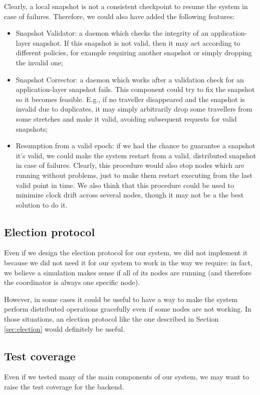 Clearly, a local snapshot is not a consistent checkpoint to resume the system
in case of failures. Therefore, we could also have added the following
features:

\begin{itemize}
  \item Snapshot Validator: a daemon which checks the integrity of an
        application-layer snapshot. If this snapshot is not valid, then it may
        act according to different policies, for example requiring another
        snapshot or simply dropping the invalid one;
  \item Snapshot Corrector: a daemon which works after a validation check for
        an application-layer snapshot fails. This component could try to fix
        the snapshot so it becomes feasible. E.g., if no traveller disappeared
        and the snapshot is invalid due to duplicates, it may simply
        arbitrarily drop some travellers from some stretches and make it valid,
        avoiding subsequent requests for valid snapshots;
  \item Resumption from a valid epoch: if we had the chance to guarantee a
        snapshot it's valid, we could make the system restart from a valid,
        distributed snapshot in case of failures. Clearly, this procedure would
        also stop nodes which are running without problems, just to make them
        restart executing from the last valid point in time.
        We also think that this procedure could be used to minimize clock
        drift across several nodes, though it may not be a the best solution
        to do it.
\end{itemize}

\subsection{Election protocol}
Even if we design the election protocol for our system, we did not implement it
because we did not need it for our system to work in the way we require: in
fact, we believe a simulation makes sense if all of its nodes are running (and
therefore the coordinator is always one specific node).

However, in some cases it could be useful to have a way to make the system
perform distributed operations gracefully even if some nodes are not working.
In those situations, an election protocol like the one described in Section
\ref{sec:election} would definitely be useful.

\subsection{Test coverage}
Even if we tested many of the main components of our system, we may want to
raise the test coverage for the backend.

